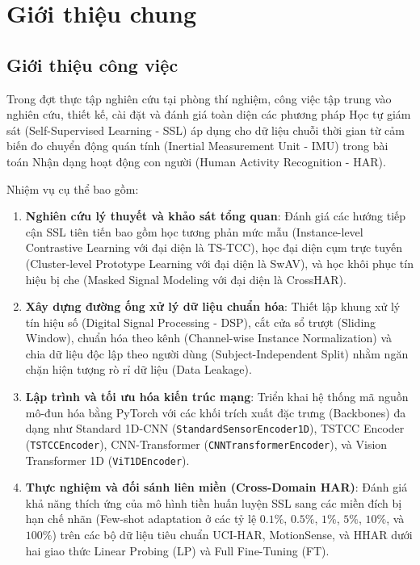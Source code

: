 \section{Giới thiệu chung}

\subsection{Giới thiệu công việc}
Trong đợt thực tập nghiên cứu tại phòng thí nghiệm, công việc tập trung vào nghiên cứu, thiết kế, cài đặt và đánh giá toàn diện các phương pháp Học tự giám sát (Self-Supervised Learning - SSL) áp dụng cho dữ liệu chuỗi thời gian từ cảm biến đo chuyển động quán tính (Inertial Measurement Unit - IMU) trong bài toán Nhận dạng hoạt động con người (Human Activity Recognition - HAR).

Nhiệm vụ cụ thể bao gồm:
\begin{enumerate}
    \item \textbf{Nghiên cứu lý thuyết và khảo sát tổng quan}: Đánh giá các hướng tiếp cận SSL tiên tiến bao gồm học tương phản mức mẫu (Instance-level Contrastive Learning với đại diện là TS-TCC), học đại diện cụm trực tuyến (Cluster-level Prototype Learning với đại diện là SwAV), và học khôi phục tín hiệu bị che (Masked Signal Modeling với đại diện là CrossHAR).
    \item \textbf{Xây dựng đường ống xử lý dữ liệu chuẩn hóa}: Thiết lập khung xử lý tín hiệu số (Digital Signal Processing - DSP), cắt cửa sổ trượt (Sliding Window), chuẩn hóa theo kênh (Channel-wise Instance Normalization) và chia dữ liệu độc lập theo người dùng (Subject-Independent Split) nhằm ngăn chặn hiện tượng rò rỉ dữ liệu (Data Leakage).
    \item \textbf{Lập trình và tối ưu hóa kiến trúc mạng}: Triển khai hệ thống mã nguồn mô-đun hóa bằng PyTorch với các khối trích xuất đặc trưng (Backbones) đa dạng như Standard 1D-CNN (\texttt{StandardSensorEncoder1D}), TSTCC Encoder (\texttt{TSTCCEncoder}), CNN-Transformer (\texttt{CNNTransformerEncoder}), và Vision Transformer 1D (\texttt{ViT1DEncoder}).
    \item \textbf{Thực nghiệm và đối sánh liên miền (Cross-Domain HAR)}: Đánh giá khả năng thích ứng của mô hình tiền huấn luyện SSL sang các miền đích bị hạn chế nhãn (Few-shot adaptation ở các tỷ lệ $0.1\%$, $0.5\%$, $1\%$, $5\%$, $10\%$, và $100\%$) trên các bộ dữ liệu tiêu chuẩn UCI-HAR, MotionSense, và HHAR dưới hai giao thức Linear Probing (LP) và Full Fine-Tuning (FT).
\end{enumerate}

